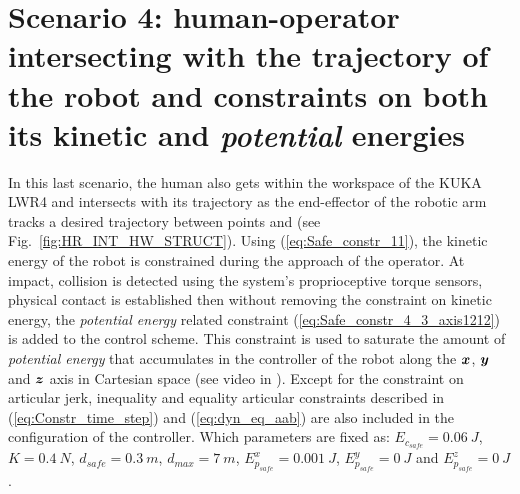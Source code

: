 \section[Human-robot interaction, scenario 4]{Scenario 4: human-operator intersecting with the trajectory of the robot and constraints on both its kinetic and \textit{potential} energies}
In this last scenario, the human also gets within the workspace of the KUKA LWR4 and intersects with its trajectory as the end-effector of the robotic arm tracks a desired trajectory between points  and  (see Fig.~\ref{fig:HR_INT_HW_STRUCT}). Using (\ref{eq:Safe_constr_11}), the kinetic energy of the robot is constrained during the approach of the operator. At impact, collision is detected using the system's proprioceptive torque sensors, physical contact is established then without removing the constraint on kinetic energy, the \textit{potential energy} related constraint (\ref{eq:Safe_constr_4_3_axis1212}) is added to the control scheme. This constraint is used to saturate the amount of \textit{potential energy} that accumulates in the controller of the robot along the $\mbox{\boldmath${x}$}$, $\mbox{\boldmath${y}$}$ and $\mbox{\boldmath${z}$}$ axis in Cartesian space (see video in \cite{kuka-url-fullconstraints}). Except for the constraint on articular jerk, inequality and equality articular constraints described in (\ref{eq:Constr_time_step}) and (\ref{eq:dyn_eq_aab}) are also included in the configuration of the controller. Which parameters are fixed as: $E_{c_{safe}} = 0.06~J$, $K = 0.4~N$, $d_{safe} = 0.3~m$, $d_{max} = 7~m$, $E_{p_{safe}}^{x} = 0.001~J$, $E_{p_{safe}}^{y} = 0~J$ and $E_{p_{safe}}^{z} = 0~J$. 

